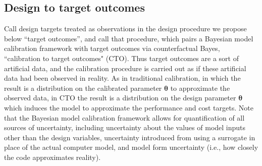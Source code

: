 \documentclass[twocolumn,10pt]{asme2ej}
\begin{document}
%
\subsection{Design to target outcomes}
%

%
Call design targets treated as observations in the design procedure we propose below ``target outcomes'', and call that procedure, which pairs a Bayesian model calibration framework with target outcomes via counterfactual Bayes, ``calibration to target outcomes" (CTO). 
%
Thus target outcomes are a sort of artificial data, and the calibration procedure is carried out as if these artificial data had been observed in reality.
%
As in traditional calibration, in which the result is a distribution on the calibrated parameter $\boldsymbol\theta$ to approximate the observed data, in CTO the result is a distribution on the design parameter $\boldsymbol\theta$ which induces the model to approximate the performance and cost targets. Note that the Bayesian model calibration framework allows for quantification of all sources of uncertainty, including uncertainty about the values of model inputs other than the design variables, uncertainty introduced from using a surrogate in place of the actual computer model, and model form uncertainty (i.e., how closely the code approximates reality).
%
%
%
%
%

%
%
%
%
%
\end{document}
